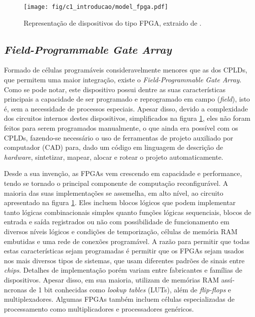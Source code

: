 \documentclass[11pt,a4paper,oneside]{book}
\begin{document}
\begin{figure}[h]
\centering
\texttt{[image: fig/c1\_introducao/model\_fpga.pdf]}
\caption{Representa\c{c}\~ao de dispositivos do tipo FPGA, extraido de \cite{Ashenden2008}.}
\label{fig:fpga}
\end{figure}

\subsection{\textit{Field-Programmable Gate Array}}
Formado de c\'elulas program\'aveis consideravelmente menores que as dos CPLDs, que permitem uma maior integra\c{c}\~ao, existe o \textit{Field-Programmable Gate Array}.
Como se pode notar, este dispositivo possui dentre as suas caracter\'i­sticas principais a capacidade de ser programado e reprogramado em campo (\textit{field}), isto \'e, sem a necessidade de processos especiais.
Apesar disso, devido a complexidade dos circuitos internos destes dispositivos, simplificados na figura \ref{fig:fpga}, eles n\~ao foram feitos para serem programados manualmente, o que ainda era poss\'i­vel com os CPLDs, fazendo-se necess\'ario o uso de ferramentas de projeto auxiliado por computador (CAD) para, dado um c\'odigo em linguagem de descri\c{c}\~ao de \textit{hardware}, sintetizar, mapear, alocar e rotear o projeto automaticamente.

Desde a sua inven\c{c}\~ao, as FPGAs vem crescendo em capacidade e performance, tendo se tornado o principal componente de computa\c{c}\~ao reconfigur\'avel.
A maioria das suas implementa\c{c}\~oes se assemelha, em alto n\'i­vel, ao circuito apresentado na figura \ref{fig:fpga}.
Eles incluem blocos l\'ogicos que podem implementar tanto l\'ogicas combinacionais simples quanto fun\c{c}\~oes l\'ogicas sequenciais, blocos de entrada e sa\'i­da registrados ou n\~ao com possibilidade de funcionamento em diversos n\'i­veis l\'ogicos e condi\c{c}\~oes de temporiza\c{c}\~ao, c\'elulas de mem\'oria RAM embutidas e uma rede de conex\~oes program\'avel.
A raz\~ao para permitir que todas estas caracter\'i­sticas sejam programadas \'e permitir que os FPGAs sejam usados nos mais diversos tipos de sistemas, que usam diferentes padr\~oes de sinais entre \textit{chips}.
Detalhes de implementa\c{c}\~ao por\'em variam entre fabricantes e fam\'i­lias de dispositivos.
Apesar disso, em sua maioria, utilizam de mem\'orias RAM ass\'i­ncronas de 1 bit conhecidas como \textit{lookup tables} (LUTs), al\'em de \textit{flip-flops} e multiplexadores.
Algumas FPGAs tamb\'em incluem c\'elulas especializadas de processamento como multiplicadores e processadores gen\'ericos.
\end{document}
